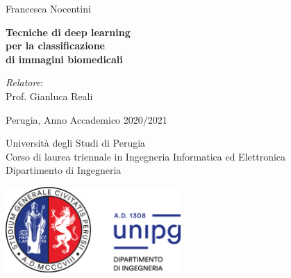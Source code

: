 \documentclass[12pt,a4paper]{report}
\begin{document}
\begin{titlepage}

{\Large \noindent Francesca Nocentini} \newline

\vspace{1cm}

{\begin{flushleft}
\fontsize{21.8}{26.16} \selectfont \bfseries \noindent 
Tecniche di deep learning \\
per la classificazione \\
di immagini biomedicali
\end{flushleft}}

\vspace{6mm}

{\large \noindent \emph{Relatore}: \vspace{1.0mm}\\ 
Prof. Gianluca Reali \newline}

\vspace{5cm}


\noindent Perugia, Anno Accademico 2020/2021 

\noindent Università degli Studi di Perugia \\
Corso di laurea triennale in Ingegneria Informatica ed Elettronica \\
Dipartimento di Ingegneria

\vspace{0.7cm}

\noindent \includegraphics[width=0.5\textwidth]{figures/logounipg2021.png}
\restoregeometry
\end{titlepage}
\normalfont
\newpage \thispagestyle{empty} \ \newpage
\onehalfspacing
\tableofcontents

\end{document}
